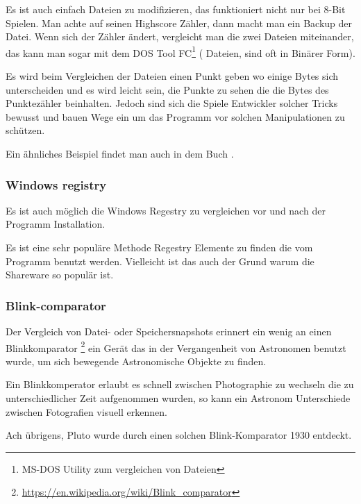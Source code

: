 
Es ist auch einfach  Dateien zu modifizieren, das funktioniert nicht nur bei 8-Bit Spielen. Man achte 
auf seinen Highscore Z\"ahler, dann macht man ein Backup der Datei. Wenn sich der  Z\"ahler \"andert, vergleicht man die 
zwei Dateien miteinander, das kann man sogar mit dem DOS Tool FC\footnote{MS-DOS Utility zum vergleichen von  Dateien} ( Dateien,
sind oft in Bin\"arer Form). 

Es wird beim Vergleichen der Dateien einen Punkt geben wo einige Bytes sich unterscheiden und 
es wird leicht sein, die Punkte zu sehen die die Bytes des Punktez\"ahler beinhalten. 
Jedoch sind sich die Spiele Entwickler solcher Tricks bewusst und bauen Wege ein um das Programm
vor solchen Manipulationen zu sch\"utzen. 

Ein \"ahnliches Beispiel findet man auch in dem Buch .



\subsubsection{Windows registry}

Es ist auch m\"oglich die Windows Regestry zu vergleichen vor und nach der Programm Installation.

Es ist eine sehr popul\"are Methode Regestry Elemente zu finden die vom Programm benutzt werden.
Vielleicht ist das auch der Grund warum die  Shareware so popul\"ar ist.


\subsubsection{Blink-comparator}

Der Vergleich von Datei- oder Speichersnapshots erinnert ein wenig an einen Blinkkomparator
\footnote{\url{https://en.wikipedia.org/wiki/Blink_comparator}}
ein Ger\"at das in der Vergangenheit von Astronomen benutzt wurde, um sich bewegende Astronomische
Objekte zu finden.

Ein Blinkkomperator erlaubt es schnell zwischen Photographie zu wechseln die zu unterschiedlicher
Zeit aufgenommen wurden, so kann ein Astronom Unterschiede zwischen Fotografien visuell erkennen.

Ach \"ubrigens, Pluto wurde durch einen solchen Blink-Komparator 1930 entdeckt.
